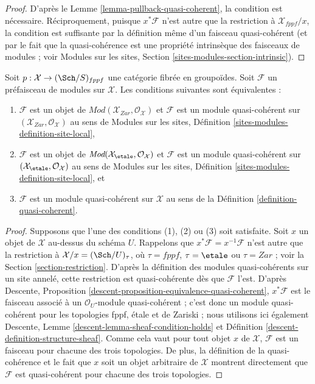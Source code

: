 \begin{proof}
D'après le
Lemme \ref{lemma-pullback-quasi-coherent},
la condition est nécessaire. Réciproquement, puisque $x^*\mathcal{F}$
n'est autre que la restriction à $\mathcal{X}_{fppf}/x$, la condition est
suffisante par la définition même d'un faisceau quasi-cohérent
(et par le fait que la quasi-cohérence est une propriété intrinsèque
des faisceaux de modules ; voir
Modules sur les sites, Section \ref{sites-modules-section-intrinsic}).
\end{proof}

\begin{lemma}
\label{lemma-characterize-quasi-coherent-bis}
Soit $p : \mathcal{X} \to (\Sch/S)_{fppf}$ une catégorie
fibrée en groupoïdes. Soit $\mathcal{F}$ un préfaisceau de
modules sur $\mathcal{X}$. Les conditions suivantes sont équivalentes :
\begin{enumerate}
\item $\mathcal{F}$ est un objet de
$\textit{Mod}(\mathcal{X}_{Zar}, \mathcal{O}_\mathcal{X})$
et $\mathcal{F}$ est un module quasi-cohérent sur
$(\mathcal{X}_{Zar}, \mathcal{O}_\mathcal{X})$ au sens de
Modules sur les sites, Définition \ref{sites-modules-definition-site-local},
\item $\mathcal{F}$ est un objet de
$\textit{Mod}(\mathcal{X}_\etale, \mathcal{O}_\mathcal{X})$
et $\mathcal{F}$ est un module quasi-cohérent sur
$(\mathcal{X}_\etale, \mathcal{O}_\mathcal{X})$ au sens de
Modules sur les sites, Définition \ref{sites-modules-definition-site-local}, et
\item $\mathcal{F}$ est un module quasi-cohérent sur $\mathcal{X}$
au sens de la Définition \ref{definition-quasi-coherent}.
\end{enumerate}
\end{lemma}

\begin{proof}
Supposons que l'une des conditions (1), (2) ou (3) soit satisfaite.
Soit $x$ un objet de $\mathcal{X}$ au-dessus du schéma $U$.
Rappelons que $x^*\mathcal{F} = x^{-1}\mathcal{F}$ n'est autre que la
restriction à $\mathcal{X}/x = (\Sch/U)_\tau$, où
$\tau = fppf$, $\tau = \etale$ ou $\tau = Zar$ ; voir la
Section \ref{section-restriction}.
D'après la définition des modules quasi-cohérents sur un site annelé,
cette restriction est quasi-cohérente dès que $\mathcal{F}$ l'est.
D'après Descente, Proposition \ref{descent-proposition-equivalence-quasi-coherent},
$x^*\mathcal{F}$ est le faisceau associé à
un $\mathcal{O}_U$-module quasi-cohérent ; c'est donc
un module quasi-cohérent pour les topologies fppf, étale et de
Zariski ; nous utilisons ici également
Descente, Lemme \ref{descent-lemma-sheaf-condition-holds} et
Définition \ref{descent-definition-structure-sheaf}.
Comme cela vaut pour tout objet $x$ de $\mathcal{X}$,
$\mathcal{F}$ est un faisceau pour chacune des trois topologies.
De plus, la définition de la quasi-cohérence et le fait que
$x$ soit un objet arbitraire de $\mathcal{X}$ montrent directement que $\mathcal{F}$
est quasi-cohérent pour chacune des trois topologies.
\end{proof}







